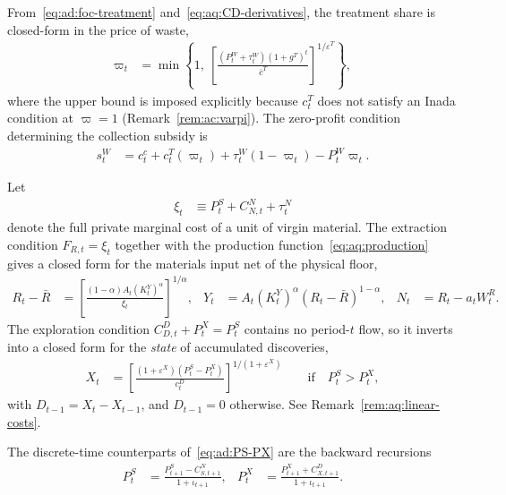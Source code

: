  From~\eqref{eq:ad:foc-treatment} and~\eqref{eq:aq:CD-derivatives}, the treatment share is closed-form in the price of waste,
\begin{align}
\varpi_t &= \min\left\{1,\ \left[\frac{\left(P^W_t+\tau^W_t\right)\left(1+g^T\right)^t}{\bar c^T}\right]^{1/\varepsilon^T}\right\},
\label{eq:aq:treatment}
\end{align}
where the upper bound is imposed explicitly because $c^T_t$ does not satisfy an Inada condition at $\varpi=1$ (Remark~\ref{rem:ac:varpi}). The zero-profit condition determining the collection subsidy is
\begin{align}
s^W_t &= c^c_t+c^T_t(\varpi_t)+\tau^W_t\left(1-\varpi_t\right)-P^W_t\varpi_t.
\label{eq:aq:zero-profit}
\end{align}

 Let
\begin{align}
\xi_t &\equiv P^S_t+C^N_{N,t}+\tau^N_t
\label{eq:aq:xi}
\end{align}
denote the full private marginal cost of a unit of virgin material. The extraction condition $F_{R,t}=\xi_t$ together with the production function~\eqref{eq:aq:production} gives a closed form for the materials input net of the physical floor,
\begin{align}
R_t-\bar R &= \left[\frac{\left(1-\alpha\right)A_t\left(K^Y_t\right)^{\alpha}}{\xi_t}\right]^{1/\alpha},
&
Y_t &= A_t\left(K^Y_t\right)^{\alpha}\left(R_t-\bar R\right)^{1-\alpha},
&
N_t &= R_t-a_tW^R_t.
\label{eq:aq:materials-closed-form}
\end{align}
The exploration condition $C^D_{D,t}+P^X_t=P^S_t$ contains no period-$t$ flow, so it inverts into a closed form for the \emph{state} of accumulated discoveries,
\begin{align}
X_t &= \left[\frac{\left(1+\varepsilon^X\right)\left(P^S_t-P^X_t\right)}{c^D_t}\right]^{1/\left(1+\varepsilon^X\right)}
\qquad\text{if}\quad P^S_t>P^X_t,
\label{eq:aq:exploration-closed-form}
\end{align}
with $D_{t-1}=X_t-X_{t-1}$, and $D_{t-1}=0$ otherwise. See Remark~\ref{rem:aq:linear-costs}.

 The discrete-time counterparts of~\eqref{eq:ad:PS-PX} are the backward recursions
\begin{align}
P^S_t &= \frac{P^S_{t+1}-C^N_{S,t+1}}{1+\iota_{t+1}},
&
P^X_t &= \frac{P^X_{t+1}+C^D_{X,t+1}}{1+\iota_{t+1}}.
\label{eq:aq:PS-PX}
\end{align}

